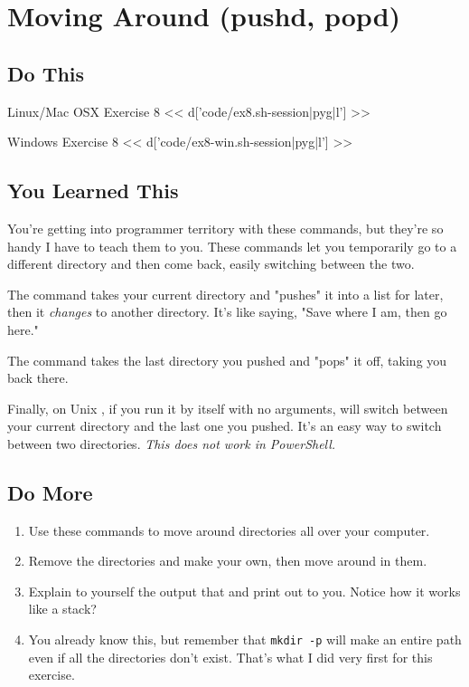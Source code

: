\chapter{Moving Around (pushd, popd)}

\section{Do This}

\begin{code}{Linux/Mac OSX Exercise 8}
<< d['code/ex8.sh-session|pyg|l'] >>
\end{code}

\begin{code}{Windows Exercise 8}
<< d['code/ex8-win.sh-session|pyg|l'] >>
\end{code}

\section{You Learned This}

You're getting into programmer territory with these commands, but they're so
handy I have to teach them to you.  These commands let you temporarily go
to a different directory and then come back, easily switching between the
two.

The  command takes your current directory and "pushes" it
into a list for later, then it \emph{changes} to another directory.  It's
like saying, "Save where I am, then go here."

The  command takes the last directory you pushed and "pops"
it off, taking you back there.

Finally, on Unix , if you run it by itself with no arguments, will
switch between your current directory and the last one you pushed.  It's
an easy way to switch between two directories.  \emph{This does not work in PowerShell.}

\section{Do More}

\begin{enumerate}
\item Use these commands to move around directories all over your
    computer.
\item Remove the  directories and make your own, then
    move around in them.
\item Explain to yourself the output that  and 
    print out to you.  Notice how it works like a stack?
\item You already know this, but remember that \verb|mkdir -p| will
    make an entire path even if all the directories don't exist.  That's what
    I did very first for this exercise.
\end{enumerate}

